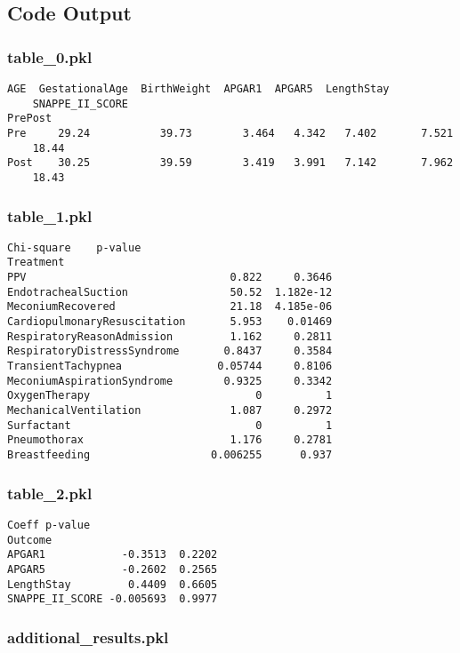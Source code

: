 \documentclass[11pt]{article}
\begin{document}
\subsection{Code Output}

\subsubsection*{table\_0.pkl}

\begin{Verbatim}[tabsize=4]
          AGE  GestationalAge  BirthWeight  APGAR1  APGAR5  LengthStay
	SNAPPE_II_SCORE
PrePost
Pre     29.24           39.73        3.464   4.342   7.402       7.521
	18.44
Post    30.25           39.59        3.419   3.991   7.142       7.962
	18.43
\end{Verbatim}

\subsubsection*{table\_1.pkl}

\begin{Verbatim}[tabsize=4]
                              Chi-square    p-value
Treatment
PPV                                0.822     0.3646
EndotrachealSuction                50.52  1.182e-12
MeconiumRecovered                  21.18  4.185e-06
CardiopulmonaryResuscitation       5.953    0.01469
RespiratoryReasonAdmission         1.162     0.2811
RespiratoryDistressSyndrome       0.8437     0.3584
TransientTachypnea               0.05744     0.8106
MeconiumAspirationSyndrome        0.9325     0.3342
OxygenTherapy                          0          1
MechanicalVentilation              1.087     0.2972
Surfactant                             0          1
Pneumothorax                       1.176     0.2781
Breastfeeding                   0.006255      0.937
\end{Verbatim}

\subsubsection*{table\_2.pkl}

\begin{Verbatim}[tabsize=4]
                    Coeff p-value
Outcome
APGAR1            -0.3513  0.2202
APGAR5            -0.2602  0.2565
LengthStay         0.4409  0.6605
SNAPPE_II_SCORE -0.005693  0.9977
\end{Verbatim}

\subsubsection*{additional\_results.pkl}
\end{document}
